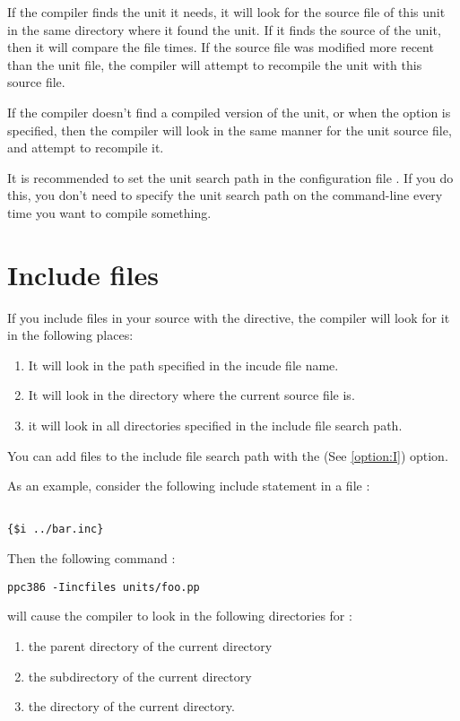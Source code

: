 \documentclass{report}
\newcommand{\seeo}[1]{See \ref{option:#1}}
\begin{document}
If the compiler finds the unit it needs, it will look for the source file of
this unit in the same directory where it found the unit. 
If it finds the source of the unit, then it will compare the file times. 
If the source file was modified more recent than the unit file, the
compiler will attempt to recompile the unit with this source file. 

If the compiler doesn't find a compiled version of the unit, or when the
 option is specified, then the compiler will look in the same
manner for the unit source file, and attempt to recompile it.

It is recommended to set the unit search path in the configuration file
. If you do this, you don't need to specify the unit search
path on the command-line every time you want to compile something.

\section{Include files}
If you include files in your source with the 
directive, the compiler will look for it in the following places:

\begin{enumerate}
\item It will look in the path specified in the incude file name. 
\item It will look in the directory where the current source file is.
\item it will look in all directories specified in the include file search
path.
\end{enumerate}
You can add files to the include file search
 path with the  (\seeo{I})
option.

As an example, consider the following include statement in a file
:
\begin{verbatim}

{$i ../bar.inc}

\end{verbatim}
Then the following command :
\begin{verbatim}
ppc386 -Iincfiles units/foo.pp
\end{verbatim}
will cause the compiler to look in the following directories for
:
\begin{enumerate}
\item the parent directory of the current directory
\item the  subdirectory of the current directory
\item the  directory of the current directory.
\end{enumerate}
\end{document}
